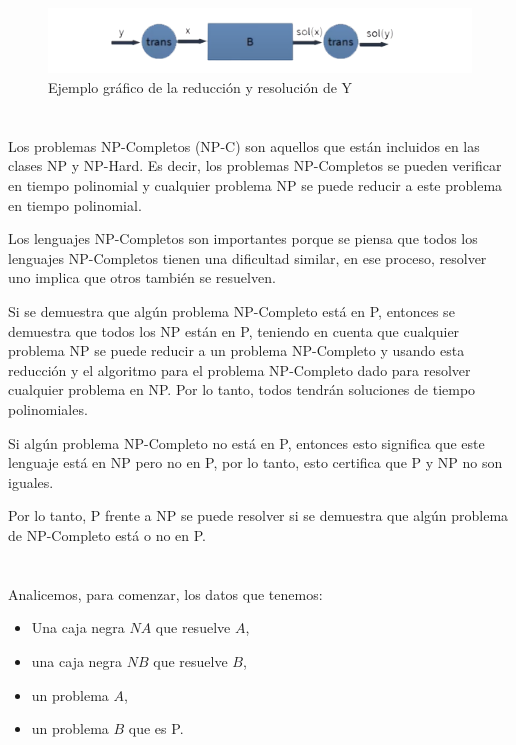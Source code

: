 \begin{figure}[H]
    \centering
    \includegraphics[width=1\textwidth]{capitulos/reducciones_polinomialesgrande.png} 
    \caption{Ejemplo gráfico de la reducción y resolución de Y}
\end{figure}

\section{}

Los problemas NP-Completos (NP-C) son aquellos que están incluidos en las clases NP y NP-Hard. Es decir, los problemas NP-Completos se pueden verificar en tiempo polinomial y cualquier problema NP se puede reducir a este problema en tiempo polinomial.

Los lenguajes NP-Completos son importantes porque se piensa que todos los lenguajes NP-Completos tienen una dificultad similar, en ese proceso, resolver uno implica que otros también se resuelven.

Si se demuestra que algún problema NP-Completo está en P, entonces se demuestra que todos los NP están en P, teniendo en cuenta que cualquier problema NP se puede reducir a un problema NP-Completo y usando esta reducción y el algoritmo para el problema NP-Completo dado para resolver cualquier problema en NP. Por lo tanto, todos tendrán soluciones de tiempo polinomiales.

Si algún problema NP-Completo no está en P, entonces esto significa que este lenguaje está en NP pero no en P, por lo tanto, esto certifica que P y NP no son iguales.

Por lo tanto, P frente a NP se puede resolver si se demuestra que algún problema de NP-Completo está o no en P. 

\section{}
Analicemos, para comenzar, los datos que tenemos:\\

\begin{itemize}
    \item Una caja negra $NA$ que resuelve $A$,
    \item una caja negra $NB$ que resuelve $B$,
    \item un problema $A$,
    \item un problema $B$ que es P.
\end{itemize}

